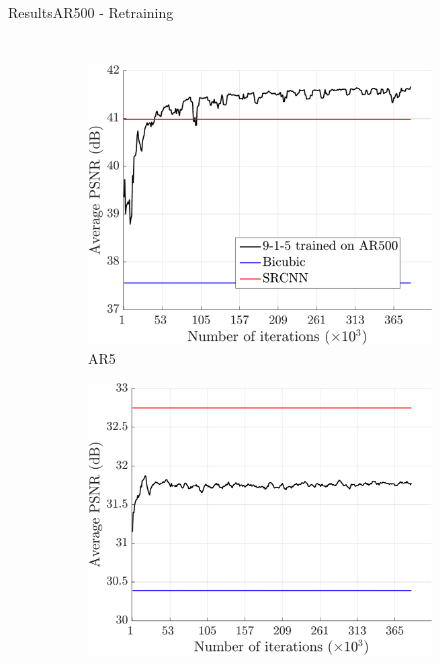 \begin{frame}{Results}{AR500 - Retraining}
    \begin{columns}
        \begin{figure}
            \centering
            \begin{subfigure}[b]{0.48\textwidth}
                \includegraphics[width=\textwidth]{sections/malte_slides/915-results-aleix5.pdf}
                \vspace*{-2mm}
                \caption*{\scriptsize AR5}
            \end{subfigure}
            \begin{subfigure}[b]{0.48\textwidth}
                \includegraphics[width=\textwidth]{sections/malte_slides/915-results-set5.pdf}

\end{subfigure}
\end{figure}
\end{columns}
\end{frame}
